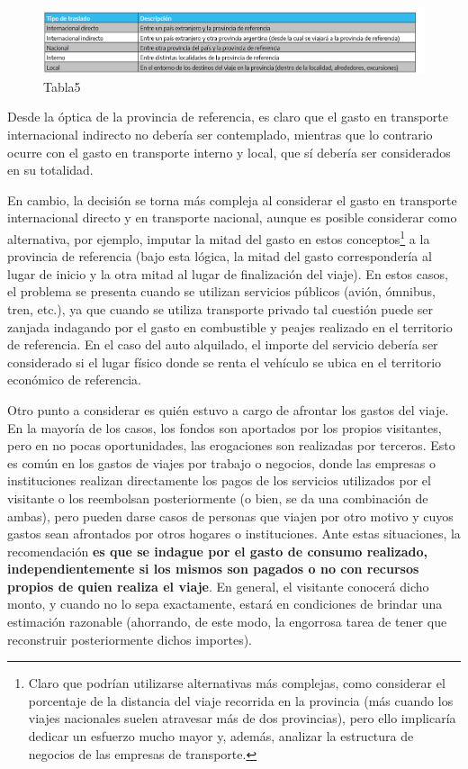 \documentclass[
]{book}
\begin{document}
\begin{figure}

{\centering \includegraphics[width=1\linewidth]{imagenes/tabla_5} 

}

\caption{Tabla5}\label{fig:Tipodetraslado}
\end{figure}

Desde la óptica de la provincia de referencia, es claro que el gasto en transporte internacional indirecto no debería ser contemplado, mientras que lo contrario ocurre con el gasto en transporte interno y local, que sí debería ser considerados en su totalidad.

En cambio, la decisión se torna más compleja al considerar el gasto en transporte internacional directo y en transporte nacional, aunque es posible considerar como alternativa, por ejemplo, imputar la mitad del gasto en estos conceptos\footnote{Claro que podrían utilizarse alternativas más complejas, como considerar el porcentaje de la distancia del viaje recorrida en la provincia (más cuando los viajes nacionales suelen atravesar más de dos provincias), pero ello implicaría dedicar un esfuerzo mucho mayor y, además, analizar la estructura de negocios de las empresas de transporte.} a la provincia de referencia (bajo esta lógica, la mitad del gasto correspondería al lugar de inicio y la otra mitad al lugar de finalización del viaje). En estos casos, el problema se presenta cuando se utilizan servicios públicos (avión, ómnibus, tren, etc.), ya que cuando se utiliza transporte privado tal cuestión puede ser zanjada indagando por el gasto en combustible y peajes realizado en el territorio de referencia. En el caso del auto alquilado, el importe del servicio debería ser considerado si el lugar físico donde se renta el vehículo se ubica en el territorio económico de referencia.

Otro punto a considerar es quién estuvo a cargo de afrontar los gastos del viaje. En la mayoría de los casos, los fondos son aportados por los propios visitantes, pero en no pocas oportunidades, las erogaciones son realizadas por terceros. Esto es común en los gastos de viajes por trabajo o negocios, donde las empresas o instituciones realizan directamente los pagos de los servicios utilizados por el visitante o los reembolsan posteriormente (o bien, se da una combinación de ambas), pero pueden darse casos de personas que viajen por otro motivo y cuyos gastos sean afrontados por otros hogares o instituciones. Ante estas situaciones, la recomendación \textbf{es que se indague por el gasto de consumo realizado, independientemente si los mismos son pagados o no con recursos propios de quien realiza el viaje}. En general, el visitante conocerá dicho monto, y cuando no lo sepa exactamente, estará en condiciones de brindar una estimación razonable (ahorrando, de este modo, la engorrosa tarea de tener que reconstruir posteriormente dichos importes).
\end{document}
